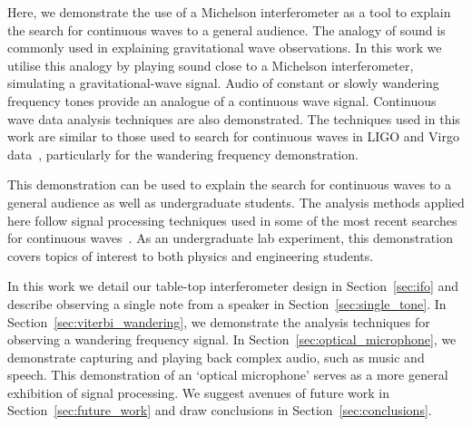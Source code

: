 \documentclass[paper-main.tex]{subfiles}
\begin{document}
Here, we demonstrate the use of a Michelson interferometer as a tool to explain the search for continuous waves to a general audience.
The analogy of sound is commonly used in explaining gravitational wave observations. 
In this work we utilise this analogy by playing sound close to a Michelson interferometer, simulating a gravitational-wave signal. 
Audio of constant or slowly wandering frequency tones provide an analogue of a continuous wave signal.
Continuous wave data analysis techniques are also demonstrated. 
The techniques used in this work are similar to those used to search for continuous waves in LIGO and Virgo data~\cite{ScoX1O2Viterbi:2019,ScoX1ViterbiO1:2017,SuvorovaEtAl:2017,SuvorovaEtAl:2017}, particularly for the wandering frequency demonstration. 


This demonstration can be used to explain the search for continuous waves to a general audience as well as undergraduate students. 
The analysis methods applied here follow signal processing techniques used in some of the most recent searches for continuous waves~\cite{ScoX1O2Viterbi:2019}. 
As an undergraduate lab experiment, this demonstration covers topics of interest to both physics and engineering students. 


In this work we detail our table-top interferometer design in Section~\ref{sec:ifo} and describe observing a single note from a speaker in Section~\ref{sec:single_tone}. In Section~\ref{sec:viterbi_wandering}, we demonstrate the analysis techniques for observing a wandering frequency signal.
In Section~\ref{sec:optical_microphone}, we demonstrate capturing and playing back complex audio, such as music and speech. This demonstration of an `optical microphone' serves as a more general exhibition of signal processing. We suggest avenues of future work in Section~\ref{sec:future_work} and draw conclusions in Section~\ref{sec:conclusions}.
\end{document}
